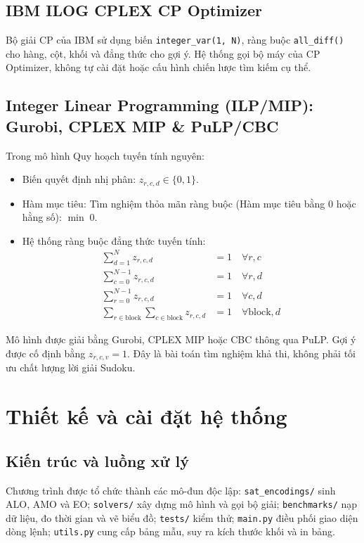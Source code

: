 \documentclass[a4paper,fleqn,nologo]{cas-sc}
\begin{document}
\subsection{IBM ILOG CPLEX CP Optimizer}
Bộ giải CP của IBM sử dụng biến \texttt{integer\_var(1, N)}, ràng buộc \texttt{all\_diff()} cho hàng, cột, khối và đẳng thức cho gợi ý. Hệ thống gọi bộ máy của CP Optimizer, không tự cài đặt hoặc cấu hình chiến lược tìm kiếm cụ thể.

\subsection{Integer Linear Programming (ILP/MIP): Gurobi, CPLEX MIP \& PuLP/CBC}
Trong mô hình Quy hoạch tuyến tính nguyên:
\begin{itemize}
    \item Biến quyết định nhị phân: $z_{r,c,d} \in \{0, 1\}$.
    \item Hàm mục tiêu: Tìm nghiệm thỏa mãn ràng buộc (Hàm mục tiêu bằng 0 hoặc hằng số): $\min \; 0$.
    \item Hệ thống ràng buộc đẳng thức tuyến tính:
    \begin{align}
    \sum_{d=1}^N z_{r,c,d} &= 1 \quad \forall r, c \\
    \sum_{c=0}^{N-1} z_{r,c,d} &= 1 \quad \forall r, d \\
    \sum_{r=0}^{N-1} z_{r,c,d} &= 1 \quad \forall c, d \\
    \sum_{r \in \text{block}} \sum_{c \in \text{block}} z_{r,c,d} &= 1 \quad \forall \text{block}, d
    \end{align}
\end{itemize}
Mô hình được giải bằng Gurobi, CPLEX MIP hoặc CBC thông qua PuLP. Gợi ý được cố định bằng $z_{r,c,v}=1$. Đây là bài toán tìm nghiệm khả thi, không phải tối ưu chất lượng lời giải Sudoku.

\section{Thiết kế và cài đặt hệ thống}
\label{sec:system}
\subsection{Kiến trúc và luồng xử lý}
Chương trình được tổ chức thành các mô-đun độc lập: \texttt{sat\_encodings/} sinh ALO, AMO và EO; \texttt{solvers/} xây dựng mô hình và gọi bộ giải; \texttt{benchmarks/} nạp dữ liệu, đo thời gian và vẽ biểu đồ; \texttt{tests/} kiểm thử; \texttt{main.py} điều phối giao diện dòng lệnh; \texttt{utils.py} cung cấp bảng mẫu, suy ra kích thước khối và in bảng.
\end{document}
